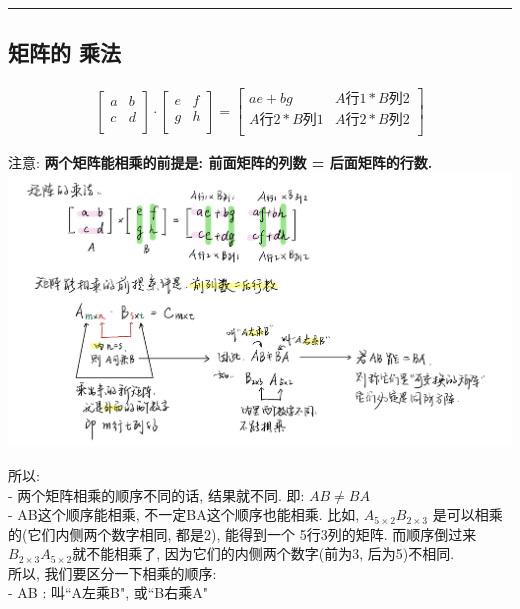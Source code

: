 \documentclass[UTF8]{ctexart}
\begin{document}
\hrule


\subsection{矩阵的 乘法}	

\begin{align*}
	\left[ \begin{matrix}
		a&		b\\
		\hline
		c&		d\\
	\end{matrix} \right] 
\cdot 
\left[ \begin{array}{c|cc}
		e&		f\\
		g&		h\\
	\end{array} \right] =\left[ \begin{matrix}
		ae+bg&		A\text{行}1*B\text{列}2\\
		A\text{行}2*B\text{列}1&		A\text{行}2*B\text{列}2\\
	\end{matrix} \right]
\end{align*}


注意: \textbf{两个矩阵能相乘的前提是: 前面矩阵的列数 = 后面矩阵的行数.} \\
\includegraphics[width=1\textwidth]{img/0016.png} 

所以: \\
- 两个矩阵相乘的顺序不同的话, 结果就不同. 即: $AB \neq BA $ \\
- AB这个顺序能相乘, 不一定BA这个顺序也能相乘. 比如, $A_{5×2}B_{2×3}$ 是可以相乘的(它们内侧两个数字相同, 都是2), 能得到一个 5行3列的矩阵. 而顺序倒过来 $B_{2×3}A_{5×2}$就不能相乘了, 因为它们的内侧两个数字(前为3, 后为5)不相同. \\

所以, 我们要区分一下相乘的顺序: \\
- AB : 叫``A左乘B", 或``B右乘A" \\
\end{document}
